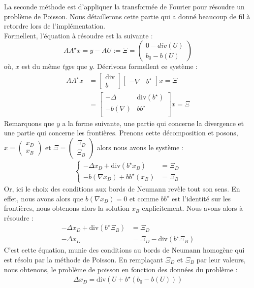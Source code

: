 \documentclass[a4paper,12pt]{article}
\renewcommand{\div}{\text{div}}
\begin{document}
La seconde méthode est d'appliquer la transformée de Fourier pour résoudre un problème de Poisson. Nous détaillerons cette partie qui a donné beaucoup de fil à retordre lors de l'implémentation. \\

Formellent, l'équation à résoudre est la suivante : 
$$
AA^{\star} x = y-AU:= \Xi = \begin{pmatrix}
0-div(U)\\
b_0-b(U)
\end{pmatrix}
$$
où, $x$ est du même \emph{type} que $y$. Décrivons formellent ce système : 
\begin{align*}
AA^{\star}x &= \begin{bmatrix}
\div \\
b
\end{bmatrix} \begin{bmatrix}
-\nabla & b^{\star}
\end{bmatrix}
x =\Xi \\
&= \begin{bmatrix}
-\Delta & \div( b^{\star})\\
-b(\nabla) & bb^{\star} \\
\end{bmatrix}x = \Xi
\end{align*}
Remarquons que $y$ a la forme suivante, une partie qui concerne la divergence et une partie qui concerne les frontières. Prenons cette décomposition et posons, $x=\begin{pmatrix}
x_D\\x_B
\end{pmatrix}$ et $\Xi=\begin{pmatrix}
\Xi_D\\\Xi_B
\end{pmatrix}$
alors nous avons le système : 
\begin{align*}
\left\{\begin{array}{cc}
-\Delta x_D + \div(b^{\star} x_B)&=\Xi_D \\
-b(\nabla x_D) + bb^{\star} (x_B)&= \Xi_B
\end{array} 
\right. 
\end{align*}
Or, ici le choix des conditions aux bords de Neumann revèle tout son sens. En effet, nous avons alors que $b(\nabla x_D)=0$ et comme $bb^{\star}$ est l'identité sur les frontières, nous obtenons alors la solution $x_B$ explicitement. Nous avons alors à résoudre :
\begin{align*}
-\Delta x_D +  \div(b^{\star}\Xi_B) &= \Xi_D \\
-\Delta x_D  &=  \Xi_D- \div(b^{\star}\Xi_B)
\end{align*} 
C'est cette équation, munie des conditions au bords de Neumann homogène qui est résolu par la méthode de Poisson. 
En remplaçant $\Xi_D$ et $\Xi_B$ par leur valeurs, nous obtenons, le problème de poisson en fonction des données du problème : 
\begin{align}
\Delta x_D = \div(U + b^{\star}(b_0-b(U)))
\end{align}
\end{document}
